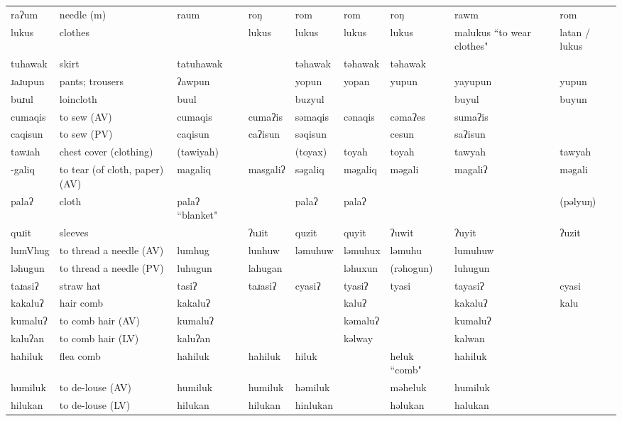 \begin{landscape}
\begin{longtable}{*{9}{>{\raggedright\arraybackslash}p{}}}
\text{*}raʔum & needle (m) & raum & roŋ & rom & rom & roŋ & rawm & rom\\
\text{*}lukus & clothes &  & lukus & lukus & lukus & lukus & malukus ``to wear clothes" & latan / lukus\\
\text{*}tuhawak & skirt & tatuhawak &  & təhawak & təhawak & təhawak &  & \\
\text{*}ɹaɹupun & pants; trousers & ʔawpun &  & yopun & yopan & yupun & yayupun & yupun\\
\text{*}buɹul & loincloth & buul &  & buzyul &  &  & buyul & buyun\\
\text{*}cumaqis & to sew (AV) & cumaqis & cumaʔis & səmaqis & cənaqis & cəmaʔes & sumaʔis & \\
\text{*}caqisun & to sew (PV) & caqisun & caʔisun & səqisun &  & cesun & saʔisun & \\
\text{*}tawɹah & chest cover (clothing) & (tawiyah) &  & (toyax) & toyah & toyah & tawyah & tawyah\\
\text{*}-galiq & to tear (of cloth, paper) (AV) & magaliq & masgaliʔ & səgaliq & məgaliq & məgali & magaliʔ & məgali\\
\text{*}palaʔ & cloth & palaʔ \newline ``blanket" &  & palaʔ & palaʔ &  &  & (pəlyuŋ)\\
\text{*}quɹit & sleeves &  & ʔuɹit & quzit & quyit & ʔuwit & ʔuyit & ʔuzit\\
\text{*}lumVhug & to thread a needle (AV) & lumhug & lunhuw & ləmuhuw & ləmuhux & ləmuhu & lumuhuw & \\
\text{*}ləhugun & to thread a needle (PV) & luhugun & lahugan &  & ləhuxun & (rəhogun) & luhugun & \\
\text{*}taɹasiʔ & straw hat & tasiʔ & taɹasiʔ & cyasiʔ & tyasiʔ & tyasi & tayasiʔ & cyasi\\
\text{*}kakaluʔ & hair comb & kakaluʔ &  &  & kaluʔ &  & kakaluʔ & kalu\\
\text{*}kumaluʔ & to comb hair (AV) & kumaluʔ &  &  & kəmaluʔ &  & kumaluʔ & \\
\text{*}kaluʔan & to comb hair (LV) & kaluʔan &  &  & kəlway &  & kalwan & \\
\text{*}hahiluk & flea comb & hahiluk & hahiluk & hiluk &  & heluk ``comb" & hahiluk & \\
\text{*}humiluk & to de-louse (AV) & humiluk & humiluk & həmiluk &  & məheluk & humiluk & \\
\text{*}hilukan & to de-louse (LV) & hilukan & hilukan & hinlukan &  & həlukan & halukan & \\

\end{longtable}
\end{landscape}
